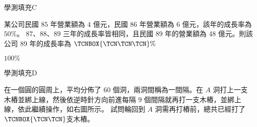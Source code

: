 \begin{QUESTIONS}
\begin{QUESTION}
\begin{QEMPTYSPACE}
        \end{QEMPTYSPACE}
    \end{QUESTION}
    \begin{QUESTION}
        \begin{ExamInfo}{91}{學測}{填充}{C}
        \end{ExamInfo}
        \begin{ExamAnsRateInfo}{38}{70}{32}{12}
        \end{ExamAnsRateInfo}
        \begin{QBODY}
            某公司民國 $85$ 年營業額為 $4$ 億元，民國 $86$ 年營業額為 $6$ 億元，該年的成長率為 $50\%$。 $87$、$88$、$89$ 三年的成長率皆相同，且民國 $89$ 年的營業額為 48 億元。則該公司 89 年的成長率為 
            $\TCNBOX{\TCN\TCN\TCN} \%$
        \end{QBODY}
        \begin{QFROMS}
        \end{QFROMS}
        \begin{QTAGS}\end{QTAGS}
        \begin{QANS}
            $100\%$
        \end{QANS}
        \begin{QSOLLIST}
        \end{QSOLLIST}
        \begin{QEMPTYSPACE}
        \end{QEMPTYSPACE}
    \end{QUESTION}
    \begin{QUESTION}
        \begin{ExamInfo}{91}{學測}{填充}{D}
        \end{ExamInfo}
        \begin{ExamAnsRateInfo}{50}{67}{53}{30}
        \end{ExamAnsRateInfo}
        \begin{QBODY}
            在一個圓的圓周上，平均分佈了 $60$ 個洞，兩洞間稱為一間隔。在 $A$ 洞打上一支木樁並綁上線，然後依逆時針方向前進每隔 $9$ 個間隔就再打一支木樁，並綁上線，依此繼續操作，如右圖所示。 試問輪回到 $A$ 洞需再打樁前，總共已經打了$\TCNBOX{{\TCN\TCN}}$支木樁。\\
            

\end{QBODY}
\end{QUESTION}
\end{QUESTIONS}
